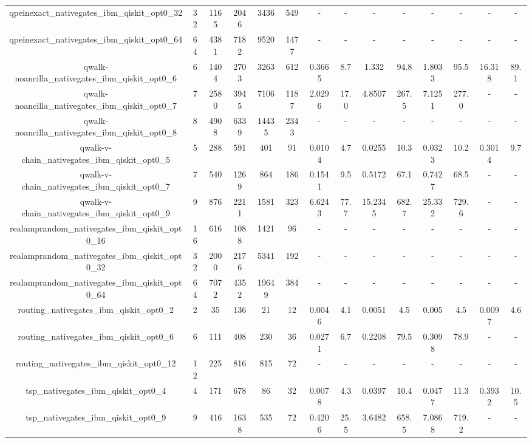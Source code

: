 \begin{table}[htb]
{\begin{tabular}{|c|c|c|c|c|c|c|c|c|c|c|c|c|c|}
qpeinexact\_nativegates\_ibm\_qiskit\_opt0\_32 & 32 & 1165 & 2046 & 3436 & 549 & - & - & - & - & - & - & - & - \\ 
qpeinexact\_nativegates\_ibm\_qiskit\_opt0\_64 & 64 & 4381 & 7182 & 9520 & 1477 & - & - & - & - & - & - & - & - \\ 
qwalk-noancilla\_nativegates\_ibm\_qiskit\_opt0\_6 & 6 & 1404 & 2703 & 3263 & 612 & 0.3665 & 8.7 & 1.332 & 94.8 & 1.8033 & 95.5 & 16.318 & 89.1 \\ 
qwalk-noancilla\_nativegates\_ibm\_qiskit\_opt0\_7 & 7 & 2580 & 3945 & 7106 & 1187 & 2.0296 & 17.0 & 4.8507 & 267.5 & 7.1251 & 277.0 & - & - \\ 
qwalk-noancilla\_nativegates\_ibm\_qiskit\_opt0\_8 & 8 & 4908 & 6339 & 14435 & 2343 & - & - & - & - & - & - & - & - \\ 
qwalk-v-chain\_nativegates\_ibm\_qiskit\_opt0\_5 & 5 & 288 & 591 & 401 & 91 & 0.0104 & 4.7 & 0.0255 & 10.3 & 0.0323 & 10.2 & 0.3014 & 9.7 \\ 
qwalk-v-chain\_nativegates\_ibm\_qiskit\_opt0\_7 & 7 & 540 & 1269 & 864 & 186 & 0.1541 & 9.5 & 0.5172 & 67.1 & 0.7427 & 68.5 & - & - \\ 
qwalk-v-chain\_nativegates\_ibm\_qiskit\_opt0\_9 & 9 & 876 & 2211 & 1581 & 323 & 6.6243 & 77.7 & 15.2345 & 682.7 & 25.332 & 729.6 & - & - \\ 
realamprandom\_nativegates\_ibm\_qiskit\_opt0\_16 & 16 & 616 & 1088 & 1421 & 96 & - & - & - & - & - & - & - & - \\ 
realamprandom\_nativegates\_ibm\_qiskit\_opt0\_32 & 32 & 2000 & 2176 & 5341 & 192 & - & - & - & - & - & - & - & - \\ 
realamprandom\_nativegates\_ibm\_qiskit\_opt0\_64 & 64 & 7072 & 4352 & 19649 & 384 & - & - & - & - & - & - & - & - \\ 
routing\_nativegates\_ibm\_qiskit\_opt0\_2 & 2 & 35 & 136 & 21 & 12 & 0.0046 & 4.1 & 0.0051 & 4.5 & 0.005 & 4.5 & 0.0097 & 4.6 \\ 
routing\_nativegates\_ibm\_qiskit\_opt0\_6 & 6 & 111 & 408 & 230 & 36 & 0.0271 & 6.7 & 0.2208 & 79.5 & 0.3098 & 78.9 & - & - \\ 
routing\_nativegates\_ibm\_qiskit\_opt0\_12 & 12 & 225 & 816 & 815 & 72 & - & - & - & - & - & - & - & - \\ 
tsp\_nativegates\_ibm\_qiskit\_opt0\_4 & 4 & 171 & 678 & 86 & 32 & 0.0078 & 4.3 & 0.0397 & 10.4 & 0.0477 & 11.3 & 0.3932 & 10.5 \\ 
tsp\_nativegates\_ibm\_qiskit\_opt0\_9 & 9 & 416 & 1638 & 535 & 72 & 0.4206 & 25.5 & 3.6482 & 658.5 & 7.0868 & 719.2 & - & - \\ 

\end{tabular}}
\end{table}

